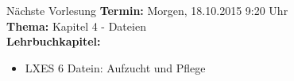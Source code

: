 \documentclass[aspectratio=43]{beamer}
\begin{document}
\begin{frame}[plain]
\begin{alertblock}{Nächste Vorlesung}
\textbf{Termin:} Morgen, 18.10.2015 9:20 Uhr\\
\textbf{Thema:} Kapitel 4 - Dateien \\
\textbf{Lehrbuchkapitel:} 
\begin{itemize}
\item LXES 6 Datein: Aufzucht und Pflege
\end{itemize}
\end{alertblock}
\end{frame}

\materialframe
\end{document}
